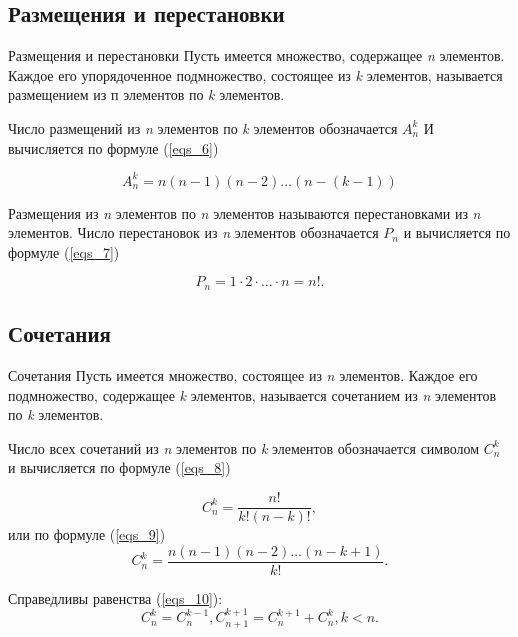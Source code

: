 \documentclass{beamer}
\begin{document}
    \subsection{Размещения и перестановки}
    \begin{frame}{Размещения и перестановки}
        \fontsize{10}{8}\selectfont Пусть имеется множество, содержащее \textit{n} элементов. Каждое его упорядоченное подмножество, состоящее из \textit{k} элементов, называется размещением из п элементов по \textit{k} элементов.

        Число размещений из \textit{n} элементов по \textit{k} элементов обозначается $A_n^k$ И вычисляется по формуле (\ref{eqs_6})

        \begin{equation}
            \label{eqs_6}
            A_n^k=n(n-1)(n-2)\ldots(n-(k-1))
        \end{equation}

        Размещения из \textit{n} элементов по \textit{n} элементов называются перестановками из \textit{n} элементов. Число перестановок из \textit{n} элементов обозначается $P_n$ и вычисляется по формуле (\ref{eqs_7})

        \begin{equation}
            \label{eqs_7}
            P_n=1\cdot2\cdot\ldots\cdot n= n!.
        \end{equation}
    \end{frame}

    \subsection{Сочетания}
    \begin{frame}{Сочетания}
        \fontsize{10}{8}\selectfont Пусть имеется множество, состоящее из \textit{n} элементов. Каждое его подмножество, содержащее \textit{k} элементов, называется сочетанием из \textit{n}  элементов по \textit{k} элементов.

        Число всех сочетаний из \textit{n} элементов по \textit{k} элементов обозначается символом $C_n^k$ и вычисляется по формуле (\ref{eqs_8})

        \begin{equation}
            \label{eqs_8}
            C_n^k=\frac{n!}{k!(n-k)!},
        \end{equation}
        или по формуле (\ref{eqs_9})
        \begin{equation}
            \label{eqs_9}
            C_n^k=\frac{n(n-1)(n-2)\ldots(n-k+1)}{k!}.
        \end{equation}

        Справедливы равенства (\ref{eqs_10}):
        \begin{equation}
            \label{eqs_10}
            C_n^k=C_n^{k-1}, C_{n+1}^{k+1}=C_n^{k+1}+C_n^k, k < n.
        \end{equation}
    \end{frame}
\end{document}
